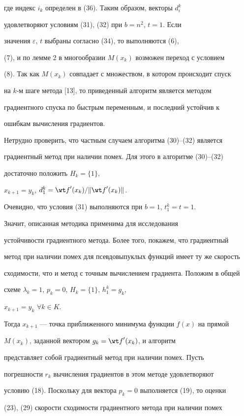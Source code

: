 где индекс $i_k$ определен в (36). Таким образом, векторы $d_i^k$


удовлетворяют условиям (31), (32) при $b=n^2$, $t=1$. Если


значения $\varepsilon$, $t$ выбраны согласно (34), то выполняются (6),


(7), и по лемме 2 в многообразии $M(x_k)$ возможен переход с условием


(8). Так как $M(x_k)$ совпадает с множеством, в котором происходит спуск


на $k$-м шаге метода [13], то приведенный алгоритм является методом


градиентного спуска по быстрым переменным, и последний устойчив к


ошибкам вычисления градиентов.





Нетрудно проверить, что частным случаем алгоритма (30)--(32) является


градиентный метод при наличии помех. Для этого в алгоритме (30)--(32)


достаточно положить $H_k=\{1\}$,


$x_{k+1}=y_k$, $d_1^k={\wt f}'(x_k)/\|{{\wt f}'(x_k)}\|$.


Очевидно, что условия (31) выполняются при $b=1$, $t_1^k=t=1$.


Значит, описанная методика применима для исследования


устойчивости градиентного метода. Более того, покажем, что градиентный


метод при наличии помех для псевдовыпуклых функций имеет ту же скорость


сходимости, что и метод с точным вычислением градиента. Положим в общей


схеме $\lambda_k=1$, $p_k=0$, $H_k=\{1\}$, $h_1^k=g_k$,


$x_{k+1}=y_k$ $\forall k\in K$.


Тогда $x_{k+1}$ --- точка приближенного минимума функции $f(x)$ на прямой


$M(x_k)$, заданной вектором $g_k={\wt f}'(x_k)$, и алгоритм


представляет собой градиентный метод при наличии помех. Пусть


погрешности $r_k$ вычисления градиентов в этом методе удовлетворяют


условию (18). Поскольку для вектора $p_k=0$ выполняется (19), то оценки


(23), (29) скорости сходимости градиентного метода при наличии помех


